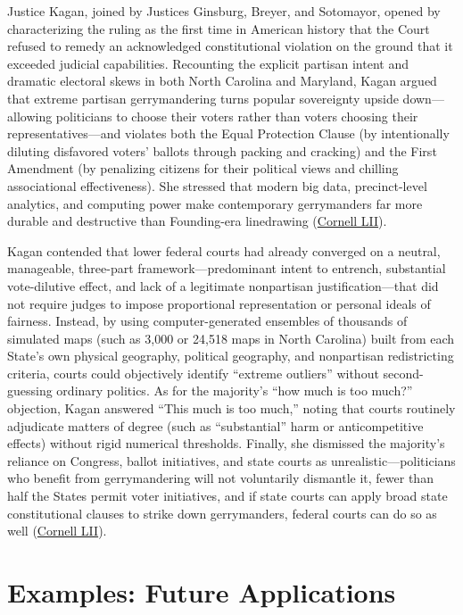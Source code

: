 \documentclass[12pt]{article}
\begin{document}
Justice Kagan, joined by Justices Ginsburg, Breyer, and Sotomayor, opened by characterizing the ruling as the first time in American history that the Court refused to remedy an acknowledged constitutional violation on the ground that it exceeded judicial capabilities. Recounting the explicit partisan intent and dramatic electoral skews in both North Carolina and Maryland, Kagan argued that extreme partisan gerrymandering turns popular sovereignty upside down---allowing politicians to choose their voters rather than voters choosing their representatives---and violates both the Equal Protection Clause (by intentionally diluting disfavored voters' ballots through packing and cracking) and the First Amendment (by penalizing citizens for their political views and chilling associational effectiveness). She stressed that modern big data, precinct-level analytics, and computing power make contemporary gerrymanders far more durable and destructive than Founding-era linedrawing (\href{https://www.law.cornell.edu/supremecourt/text/18-422}{Cornell LII}).

Kagan contended that lower federal courts had already converged on a neutral, manageable, three-part framework---predominant intent to entrench, substantial vote-dilutive effect, and lack of a legitimate nonpartisan justification---that did not require judges to impose proportional representation or personal ideals of fairness. Instead, by using computer-generated ensembles of thousands of simulated maps (such as 3,000 or 24,518 maps in North Carolina) built from each State's own physical geography, political geography, and nonpartisan redistricting criteria, courts could objectively identify ``extreme outliers'' without second-guessing ordinary politics. As for the majority's ``how much is too much?'' objection, Kagan answered ``This much is too much,'' noting that courts routinely adjudicate matters of degree (such as ``substantial'' harm or anticompetitive effects) without rigid numerical thresholds. Finally, she dismissed the majority's reliance on Congress, ballot initiatives, and state courts as unrealistic---politicians who benefit from gerrymandering will not voluntarily dismantle it, fewer than half the States permit voter initiatives, and if state courts can apply broad state constitutional clauses to strike down gerrymanders, federal courts can do so as well (\href{https://www.law.cornell.edu/supremecourt/text/18-422}{Cornell LII}).

\section{Examples: Future Applications}
\end{document}

